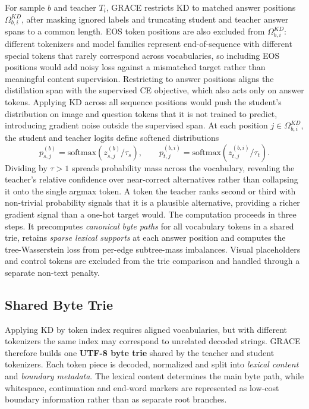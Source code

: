 For sample \(b\) and teacher \(T_i\), GRACE restricts KD to matched answer
positions \(\Omega_{b,i}^{KD}\), after masking ignored labels and truncating
student and teacher answer spans to a common length. EOS token positions are also excluded from \(\Omega_{b,i}^{KD}\):
different tokenizers and model families represent end-of-sequence with
different special tokens that rarely correspond across vocabularies, so
including EOS positions would add noisy loss against a mismatched target
rather than meaningful content supervision.
Restricting to answer positions aligns the distillation span with the
supervised CE objective, which also acts only on answer tokens. Applying KD
across all sequence positions would push the student's distribution on image
and question tokens that it is not trained to predict, introducing gradient
noise outside the supervised span. At each position
\(j \in \Omega_{b,i}^{KD}\), the student and teacher logits define softened
distributions
\[
p^{(b)}_{s,j}
=
\mathrm{softmax}\!\left(z^{(b)}_{s,j}/\tau_s\right),
\qquad
p^{(b,i)}_{t,j}
=
\mathrm{softmax}\!\left(z^{(b,i)}_{t,j}/\tau_t\right).
\]
Dividing by \(\tau > 1\) spreads probability mass across the vocabulary,
revealing the teacher's relative confidence over near-correct alternatives
rather than collapsing it onto the single argmax token. A token the teacher
ranks second or third with non-trivial probability signals that it is a
plausible alternative, providing a richer gradient signal than a one-hot
target would.
The computation proceeds in three steps. It precomputes \textit{canonical byte paths}
for all vocabulary tokens in a shared trie, retains \textit{sparse lexical supports} at
each answer position and computes the tree-Wasserstein loss from per-edge
subtree-mass imbalances. Visual placeholders and control tokens are excluded
from the trie comparison and handled through a separate non-text penalty.

\subsection{Shared Byte Trie}

Applying KD by token index requires aligned vocabularies, but with different
tokenizers the same index may correspond to unrelated decoded strings. GRACE
therefore builds one \textbf{UTF-8 byte trie} shared by the teacher and student
tokenizers. Each token piece is decoded, normalized and split into \textit{lexical
content} and \textit{boundary metadata}. The lexical content determines the main byte
path, while whitespace, continuation and end-word markers are represented as
low-cost boundary information rather than as separate root branches.

